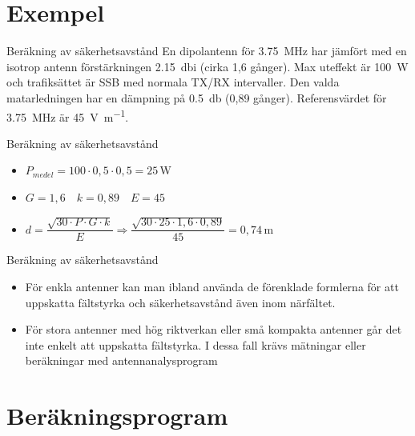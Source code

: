 \documentclass{beamer}
\begin{document}
\section{Exempel}

\begin{frame}{Beräkning av säkerhetsavstånd}
En dipolantenn för \SI{3,75}{\mega\hertz} har jämfört med en isotrop antenn förstärkningen
\SI{2,15}{\decibel}i (cirka 1,6 gånger).
Max uteffekt är \SI{100}{\watt} och trafiksättet är SSB med normala TX/RX intervaller.
Den valda matarledningen har en dämpning på \SI{0,5}{\decibel} (0,89 gånger).
Referensvärdet för \SI{3,75}{\mega\hertz} är \SI{45}{\volt\per\meter}.
\end{frame}

\begin{frame}{Beräkning av säkerhetsavstånd}
\begin{itemize}
	\item \(P_{medel} = 100 \cdot 0,5 \cdot 0,5 = 25\, \mathrm{W}\) \vspace{4mm}
	\item \(G = 1,6 \quad k = 0,89 \quad E = 45\) \vspace{3mm}
	\item \(d = \dfrac{\sqrt{30 \cdot P \cdot G \cdot k}}{E} \Rightarrow \dfrac{\sqrt{30 \cdot 25 \cdot 1,6 \cdot 0,89}}{45} = 0,74\, \mathrm{m}\)
\end{itemize}
\end{frame}

\begin{frame}{Beräkning av säkerhetsavstånd}
\begin{itemize}
	\item För enkla antenner kan man ibland använda de förenklade formlerna för
	att uppskatta fältstyrka och säkerhetsavstånd även inom närfältet.
	\item För stora antenner med hög riktverkan eller små kompakta antenner går
	det inte enkelt att uppskatta fältstyrka. I dessa fall krävs mätningar eller
	beräkningar med antennanalysprogram
\end{itemize}
\end{frame}


\section{Beräkningsprogram}
\end{document}
